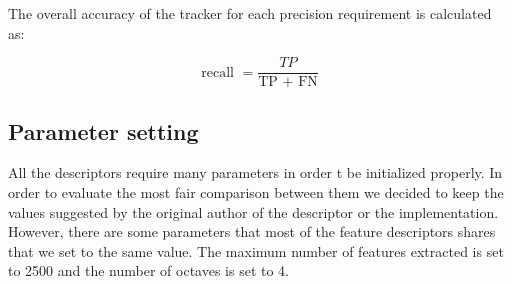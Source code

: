 The overall accuracy of the tracker for each precision requirement is calculated as:

\begin{equation}
\text{recall } = \frac{TP}{\text{TP } + \text{ FN}}
\end{equation}


\subsection{Parameter setting}

All the descriptors require many parameters in order t be initialized properly. In order to evaluate the most fair comparison between them we decided to keep the values suggested by the original author of the descriptor or the implementation. However, there are some parameters that most of the feature descriptors shares that we set to the same value. The maximum number of features extracted is set to 2500 and the number of octaves is set to 4.



